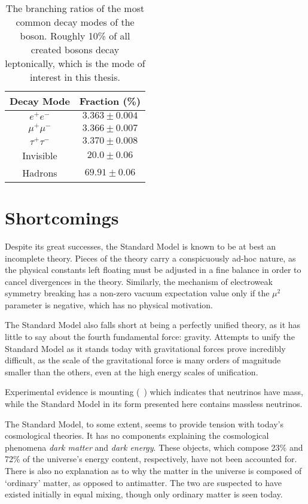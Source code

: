 \begin{table}[h]
\centering
\begin{tabular}{|c|c|}
\hline
Decay Mode & Fraction (\%) \\
\hline
$e^+e^-$        & $3.363\pm0.004$   \\
$\mu^+\mu^-$    & $3.366\pm0.007$   \\
$\tau^+\tau^-$  & $3.370\pm0.008$   \\
Invisible       & $20.0\pm0.06$     \\
Hadrons         & $69.91\pm0.06$    \\
\hline
\end{tabular}
\caption[Breakdown of decay modes for the \Z boson.]{The branching ratios of the
most common decay modes of the \Z boson. Roughly 10\% of all created \Z bosons
decay leptonically, which is the mode of interest in this thesis.}
\label{tab:Zdecays}
\end{table}

\section{Shortcomings}
\label{sec:shortcomings}
Despite its great successes, the Standard Model is known to be at best an
incomplete theory. Pieces of the theory carry a conspicuously ad-hoc nature, as
the physical constants left floating must be adjusted in a fine balance in order
to cancel divergences in the theory. Similarly, the mechanism of electroweak
symmetry breaking has a non-zero vacuum expectation value only if the $\mu^2$
parameter is negative, which has no physical motivation.

The Standard Model also falls short at being a perfectly unified theory, as it has
little to say about the fourth fundamental force: gravity. Attempts to unify
the Standard Model as it stands today with gravitational forces prove incredibly
difficult, as the scale of the gravitational force is many orders of magnitude
smaller than the others, even at the high energy scales of unification.

Experimental evidence is mounting (~\cite{snoNeutrinoMixing,
superKNeutrinoMixing, dayaNeutrinoMixing}) which indicates
that neutrinos have mass, while the Standard Model in its form presented here
contains massless neutrinos.

The Standard Model, to some extent, seems to provide tension with today's
cosmological theories. It has no components explaining the cosmological phenomena
\emph{dark matter} and \emph{dark energy}. These objects, which compose 23\% and
72\% of the universe's energy content, respectively, have not been accounted for.
There is also no explanation as to why the matter in the universe is composed of 
`ordinary' matter, as opposed to antimatter. The two are suspected to have
existed initially in equal mixing, though only ordinary matter is seen today.

